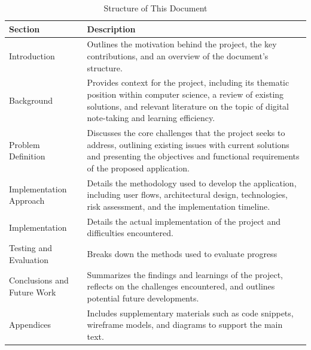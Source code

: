\begin{table}[h!]
\centering
\begin{tabular}{|p{5cm}|p{10cm}|}
\hline
\textbf{Section} & \textbf{Description} \\ \hline
Introduction & Outlines the motivation behind the project, the key contributions, and an overview of the document's structure. \\ \hline
Background & Provides context for the project, including its thematic position within computer science, a review of existing solutions, and relevant literature on the topic of digital note-taking and learning efficiency. \\ \hline
Problem Definition & Discusses the core challenges that the project seeks to address, outlining existing issues with current solutions and presenting the objectives and functional requirements of the proposed application. \\ \hline
Implementation Approach & Details the methodology used to develop the application, including user flows, architectural design, technologies, risk assessment, and the implementation timeline. \\ \hline
Implementation & Details the actual implementation of the project and difficulties encountered. \\ \hline
Testing and Evaluation & Breaks down the methods used to evaluate progress \\ \hline
Conclusions and Future Work & Summarizes the findings and learnings of the project, reflects on the challenges encountered, and outlines potential future developments. \\ \hline
Appendices & Includes supplementary materials such as code snippets, wireframe models, and diagrams to support the main text. \\ \hline
\end{tabular}
\caption{Structure of This Document}
\label{tab:document_structure}
\end{table}


